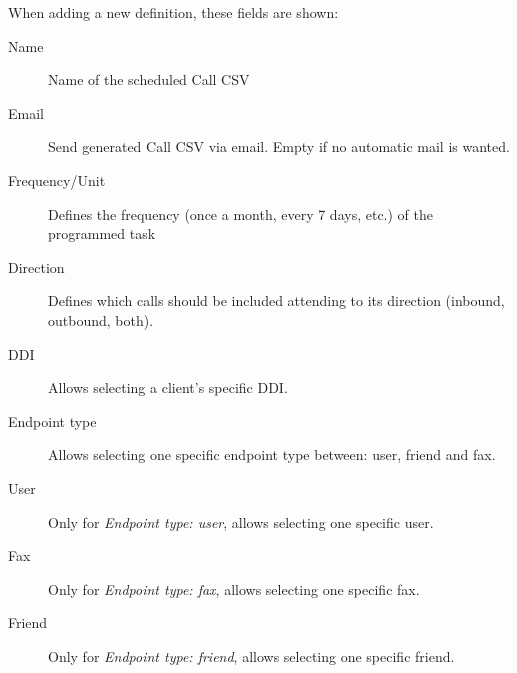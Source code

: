 \documentclass[letterpaper,10pt,spanish]{sphinxmanual}
\begin{document}
When adding a new definition, these fields are shown:
\begin{description}
\item[{Name}] \leavevmode{}\label{administration_portal/client/vpbx/calls/call_csv_schedulers:term-name}
Name of the scheduled Call CSV

\item[{Email}] \leavevmode{}\label{administration_portal/client/vpbx/calls/call_csv_schedulers:term-email}
Send generated Call CSV via email. Empty if no automatic mail is wanted.

\item[{Frequency/Unit}] \leavevmode{}\label{administration_portal/client/vpbx/calls/call_csv_schedulers:term-frequency-unit}
Defines the frequency (once a month, every 7 days, etc.) of the programmed task

\item[{Direction}] \leavevmode{}\label{administration_portal/client/vpbx/calls/call_csv_schedulers:term-direction}
Defines which calls should be included attending to its direction (inbound, outbound, both).

\item[{DDI}] \leavevmode{}\label{administration_portal/client/vpbx/calls/call_csv_schedulers:term-ddi}
Allows selecting a client's specific DDI.

\item[{Endpoint type}] \leavevmode{}\label{administration_portal/client/vpbx/calls/call_csv_schedulers:term-endpoint-type}
Allows selecting one specific endpoint type between: user, friend and fax.

\item[{User}] \leavevmode{}\label{administration_portal/client/vpbx/calls/call_csv_schedulers:term-user}
Only for \emph{Endpoint type: user}, allows selecting one specific user.

\item[{Fax}] \leavevmode{}\label{administration_portal/client/vpbx/calls/call_csv_schedulers:term-fax}
Only for \emph{Endpoint type: fax}, allows selecting one specific fax.

\item[{Friend}] \leavevmode{}\label{administration_portal/client/vpbx/calls/call_csv_schedulers:term-friend}
Only for \emph{Endpoint type: friend}, allows selecting one specific friend.

\end{description}
\end{document}
